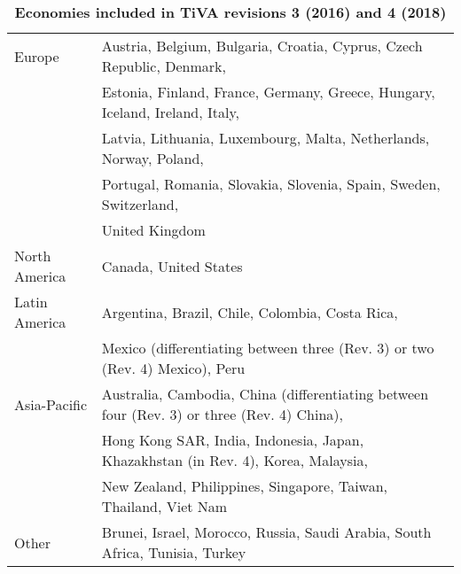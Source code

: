 \documentclass[11pt,a4paper]{article}
\begin{document}
\begin{table}[!h]
\begin{threeparttable}
\centering
\centering
\caption{\small{\textbf{Economies included in TiVA revisions 3 (2016) and 4 (2018)}}}
\small
\begin{tabular}{ll}
\hline\hline
Europe & Austria, Belgium, Bulgaria, Croatia, Cyprus, Czech Republic, Denmark,\\
& Estonia, Finland, France, Germany, Greece, Hungary, Iceland, Ireland, Italy,\\
& Latvia, Lithuania, Luxembourg, Malta, Netherlands, Norway, Poland,\\
&Portugal, Romania, Slovakia, Slovenia, Spain, Sweden, Switzerland,\\
& United Kingdom\\
North  America& Canada, United States\\
Latin America & Argentina, Brazil, Chile, Colombia, Costa Rica, \\ 
&Mexico (differentiating between three (Rev. 3) or two (Rev. 4) Mexico), Peru\\
Asia-Pacific & Australia, Cambodia, China (differentiating between four (Rev. 3) or three (Rev. 4) China), \\
& Hong Kong SAR, India, Indonesia, Japan, Khazakhstan (in Rev. 4), Korea, Malaysia, \\
& New Zealand, Philippines, Singapore, Taiwan, Thailand, Viet Nam\\
Other & Brunei, Israel, Morocco, Russia, Saudi Arabia, South Africa, Tunisia, Turkey\\
\hline\hline
\end{tabular} 
\label{tab:tiva}
\end{threeparttable}
\end{table} 
\end{document}
